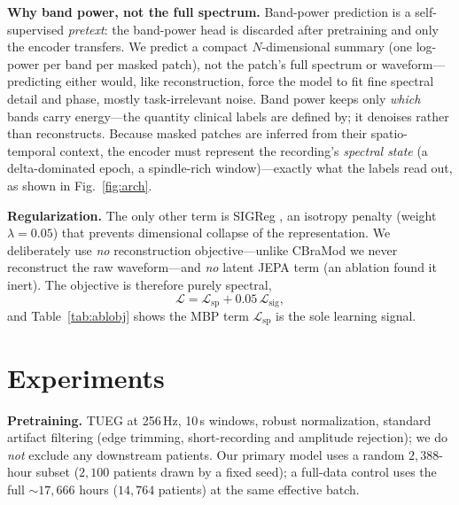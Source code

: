 \documentclass[letterpaper]{article} %
\begin{document}
\noindent\textbf{Why band power, not the full spectrum.} Band-power prediction is
a self-supervised \emph{pretext}: the band-power head is discarded after
pretraining and only the encoder transfers. We predict a compact $N$-dimensional
summary (one log-power per band per masked patch), not the patch's full spectrum or
waveform---predicting either would, like reconstruction, force the model to fit fine
spectral detail and phase, mostly task-irrelevant noise. Band power keeps only
\emph{which} bands carry energy---the quantity clinical labels are defined by; it
denoises rather than reconstructs. Because masked patches are inferred from their
spatio-temporal context, the encoder must represent the recording's \emph{spectral
state} (a delta-dominated epoch, a spindle-rich window)---exactly what the labels
read out, as shown in Fig.~\ref{fig:arch}.

\noindent\textbf{Regularization.} The only other term is SIGReg
\cite{balestriero2025lejepa}, an isotropy penalty (weight $\lambda{=}0.05$) that
prevents dimensional collapse of the representation. We deliberately use \emph{no}
reconstruction objective---unlike CBraMod we never reconstruct the raw
waveform---and \emph{no} latent JEPA term (an ablation found it inert). The
objective is therefore purely spectral,
\begin{equation}
\mathcal{L}=\mathcal{L}_{\mathrm{sp}}+0.05\,\mathcal{L}_{\mathrm{sig}},
\end{equation}
and Table~\ref{tab:ablobj} shows the MBP term $\mathcal{L}_{\mathrm{sp}}$ is
the sole learning signal.

\section{Experiments}
\noindent\textbf{Pretraining.} TUEG at 256\,Hz, 10\,s windows, robust
normalization, standard artifact filtering (edge trimming, short-recording and
amplitude rejection); we do \emph{not} exclude any downstream patients. Our
primary model uses a random $2{,}388$-hour subset ($2{,}100$ patients drawn
by a fixed seed); a full-data control uses the full ${\sim}17{,}666$ hours
($14{,}764$ patients) at the same effective batch.
\end{document}
